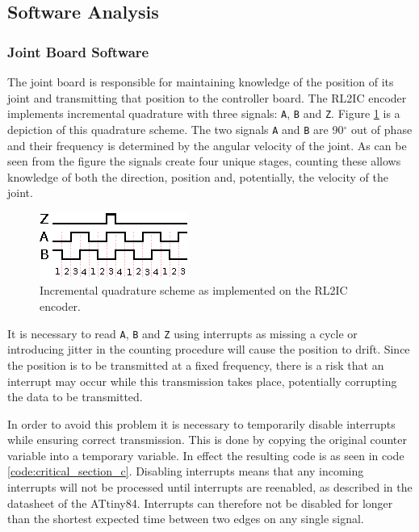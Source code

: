 \subsection{Software Analysis} %
\label{sub:software_analysis}

\subsubsection{Joint Board Software} %
\label{ssub:joint_board_software}
The joint board is responsible for maintaining knowledge of the position of its joint and transmitting that position to the controller board.
The RL2IC encoder implements incremental quadrature with three signals: \texttt{A}, \texttt{B} and \texttt{Z}.
Figure \ref{fig:quadrature} is a depiction of this quadrature scheme.
The two signals \texttt{A} and \texttt{B} are 90$^\circ$ out of phase and their frequency is determined by the angular velocity of the joint.
As can be seen from the figure the signals create four unique stages, counting these allows knowledge of both the direction, position and, potentially, the velocity of the joint.

\begin{figure}[h]
	\centering
	\includegraphics[width=.5\linewidth]{graphics/quadrature}
	\caption{Incremental quadrature scheme as implemented on the RL2IC encoder.}
	\label{fig:quadrature}
\end{figure}


It is necessary to read \texttt{A}, \texttt{B} and \texttt{Z} using interrupts as missing a cycle or introducing jitter in the counting procedure will cause the position to drift.
Since the position is to be transmitted at a fixed frequency, there is a risk that an interrupt may occur while this transmission takes place, potentially corrupting the data to be transmitted.

In order to avoid this problem it is necessary to temporarily disable interrupts while ensuring correct transmission.
This is done by copying the original counter variable into a temporary variable. 
In effect the resulting code is as seen in code \ref{code:critical_section_c}.
Disabling interrupts means that any incoming interrupts will not be processed until interrupts are reenabled, as described in the datasheet of the ATtiny84.
Interrupts can therefore not be disabled for longer than the shortest expected time between two edges on any single signal.

